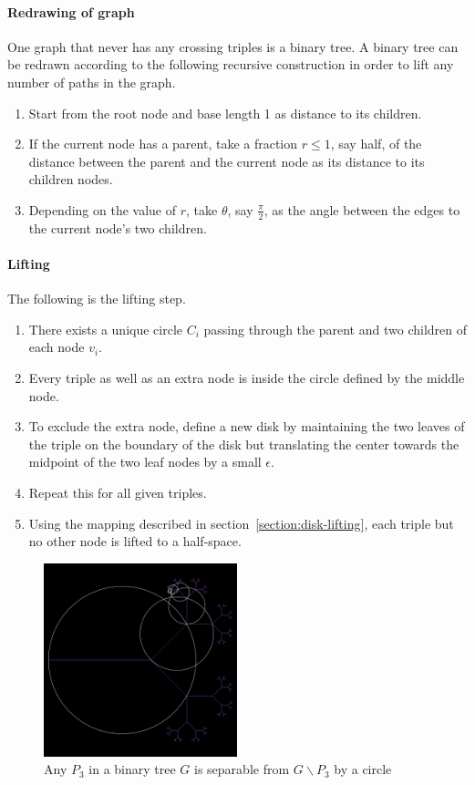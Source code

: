 \documentclass{NSF}
\begin{document}
\paragraph{Redrawing of graph} One graph that never has any crossing triples is a binary tree. A binary tree can be redrawn according to the following recursive construction in order to lift any number of paths in the graph.
\begin{enumerate}
\item Start from the root node and base length 1 as distance to its children.
\item If the current node has a parent, take a fraction $r\leq 1$, say half, of the distance between the parent and the current node as its distance to its children nodes.
\item Depending on the value of $r$, take $\theta$, say $\frac{\pi}{2}$, as the angle between the edges to the current node's two children.
\end{enumerate}

\paragraph{Lifting} The following is the lifting step.
\begin{enumerate}
\item There exists a unique circle $C_i$ passing through the parent and two children of each node $v_i$.
\item Every triple as well as an extra node is inside the circle defined by the middle node.
\item To exclude the extra node, define a new disk by maintaining the two leaves of the triple on the boundary of the disk but translating the center towards the midpoint of the two leaf nodes by a small $\epsilon$.
\item Repeat this for all given triples.
\item Using the mapping described in section~\ref{section:disk-lifting}, each triple but no other node is lifted to a half-space.
\end{enumerate}

\begin{figure}[ht]
\centering

\includegraphics[width=0.5\textwidth]{images/binary-tree-with-circles}
\caption{Any $P_3$ in a binary tree $G$ is separable from $G\backslash P_3$ by a circle}
\end{figure}
\end{document}
